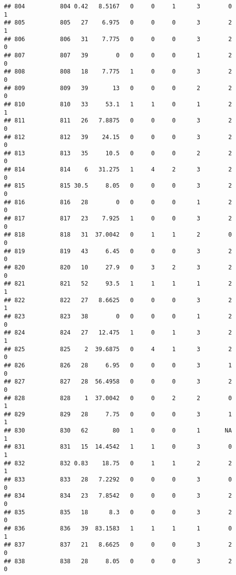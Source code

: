 \documentclass[
]{article}
\begin{document}
\begin{verbatim}
## 804          804 0.42   8.5167   0     0     1      3        0         1
## 805          805   27    6.975   0     0     0      3        2         1
## 806          806   31    7.775   0     0     0      3        2         0
## 807          807   39        0   0     0     0      1        2         0
## 808          808   18    7.775   1     0     0      3        2         0
## 809          809   39       13   0     0     0      2        2         0
## 810          810   33     53.1   1     1     0      1        2         1
## 811          811   26   7.8875   0     0     0      3        2         0
## 812          812   39    24.15   0     0     0      3        2         0
## 813          813   35     10.5   0     0     0      2        2         0
## 814          814    6   31.275   1     4     2      3        2         0
## 815          815 30.5     8.05   0     0     0      3        2         0
## 816          816   28        0   0     0     0      1        2         0
## 817          817   23    7.925   1     0     0      3        2         0
## 818          818   31  37.0042   0     1     1      2        0         0
## 819          819   43     6.45   0     0     0      3        2         0
## 820          820   10     27.9   0     3     2      3        2         0
## 821          821   52     93.5   1     1     1      1        2         1
## 822          822   27   8.6625   0     0     0      3        2         1
## 823          823   38        0   0     0     0      1        2         0
## 824          824   27   12.475   1     0     1      3        2         1
## 825          825    2  39.6875   0     4     1      3        2         0
## 826          826   28     6.95   0     0     0      3        1         0
## 827          827   28  56.4958   0     0     0      3        2         0
## 828          828    1  37.0042   0     0     2      2        0         1
## 829          829   28     7.75   0     0     0      3        1         1
## 830          830   62       80   1     0     0      1       NA         1
## 831          831   15  14.4542   1     1     0      3        0         1
## 832          832 0.83    18.75   0     1     1      2        2         1
## 833          833   28   7.2292   0     0     0      3        0         0
## 834          834   23   7.8542   0     0     0      3        2         0
## 835          835   18      8.3   0     0     0      3        2         0
## 836          836   39  83.1583   1     1     1      1        0         1
## 837          837   21   8.6625   0     0     0      3        2         0
## 838          838   28     8.05   0     0     0      3        2         0

\end{verbatim}
\end{document}
